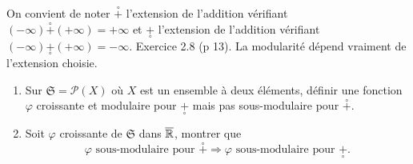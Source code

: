   \noindent On convient de noter $\overset{\circ}{+}$ l'extension de l'addition vérifiant $(-\infty) \overset{\circ}{+} (+\infty) = +\infty$ et $\underset{\circ}{+}$ l'extension de l'addition vérifiant $(-\infty) \underset{\circ}{+} (+\infty) = -\infty$. \newline
  Exercice 2.8 (p 13). La modularité dépend vraiment de l'extension choisie.
  \begin{enumerate}
    \item Sur $\mathfrak{S} = \mathcal{P}(X)$ où $X$ est un ensemble à deux éléments, définir une fonction $\varphi$ croissante et modulaire pour $\underset{\circ}{+}$ mais pas sous-modulaire pour $\overset{\circ}{+}$.
    \item Soit $\varphi$ croissante de $\mathfrak{S}$ dans $\overline{\mathbb{R}}$, montrer que
\begin{displaymath}
  \varphi \text{ sous-modulaire pour } \overset{\circ}{+} \Rightarrow \varphi \text{ sous-modulaire pour } \underset{\circ}{+}.
\end{displaymath}
  \end{enumerate}
